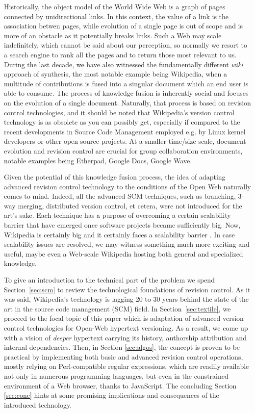 \documentclass{acm_proc_article-sp}
\begin{document}
Historically, the object model of the World Wide Web is a graph
of pages connected by unidirectional links. In this context,
the value of a link is the association betwen pages, while
evolution of a single page is out of scope and is more of an
obstacle as it potentially breaks links.
Such a Web may scale indefinitely, which cannot be said about
our perception, so normally we resort to a search engine to rank
all the pages and to return those most relevant to us.
During the last decade, we have also witnessed the fundamentally
different \emph{wiki} approach of synthesis, the most notable
example being Wikipedia, when a multitude of contributions is
fused into a singular document which an end user is able to consume.
The process of knowledge fusion is inherently social and
focuses on the evolution of a single document.
Naturally, that process is based on revision control technologies,
and it should be noted that Wikipedia's version control
technology is as obsolete as you can possibly get, especially
if compared to the recent developments in Source Code Management
employed e.g. by Linux kernel developers or other 
open-source projects.
At a smaller time/size scale, document evolution and revision control
are crucial for group collaboration environments, notable examples
being Etherpad, Google Docs, Google Wave.

Given the potential of this knowledge fusion process, the idea
of adapting advanced revision control technology to the conditions
of the Open Web naturally comes to mind. 
Indeed, all the advanced SCM techniques, such as branching,
3-way merging, distributed version control, et cetera, were not
introduced for the art's sake. Each technique has a purpose of
overcoming a certain scalability barrier that have emerged once
software projects became sufficiently big. Now, Wikipedia is
certainly big and it certainly faces a scalability barrier
\cite{wp-scale}. In case scalability issues are resolved, we
may witness something much more exciting and useful, maybe even 
a Web-scale Wikipedia hosting both general and specialized
knowledge.

To give an introduction to the technical part of the problem we spend
Section~\ref{sec:scm} to
review the technological foundations of
revision control. As it was said, Wikipedia's technology 
is lagging 20 to 30 years behind the state of the art in the
source code management (SCM) field. 
In Section~\ref{sec:textile}, we proceed to the focal topic of
this paper which is
adaptation of advanced version control technologies for Open-Web
hypertext versioning. As a result, we come up with a vision of
\emph{deeper} hypertext carrying its history, authorship
attribution and internal dependencies.
Then, in Section \ref{sec:algos}, the concept is proven to be
practical by implementing both
basic and advanced revision control operations, mostly relying
on Perl-compatible regular expressions, which are readily available not
only in numerous programming languages, but even in the
constrained environment of a Web browser, thanks to JavaScript.
The concluding Section \ref{sec:conc} hints at some promising
implications and consequences of the introduced technology.
\end{document}
